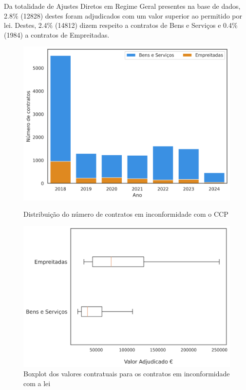 Da totalidade de Ajustes Diretos em Regime Geral presentes na base de dados, 2.8\% (12828) destes foram adjudicados com um valor superior ao permitido por lei. Destes, 2.4\% (14812) dizem respeito a contratos de Bens e Serviços e 0.4\% (1984) a contratos de Empreitadas.


\begin{figure}[H]
	\centering
	\begin{minipage}{.45\linewidth}
		\includegraphics[width=\linewidth]{imagens/rf1/dist.png}
		\caption{Distribuição do número de contratos em inconformidade com o CCP}
		
	\end{minipage}
	\hfill
	\begin{minipage}{.5\linewidth}
		\includegraphics[width=\linewidth]{imagens/rf1/boxplot.png}
		\caption{Boxplot dos valores contratuais para os contratos em inconformidade com a lei}
		
	\end{minipage}
\end{figure}


